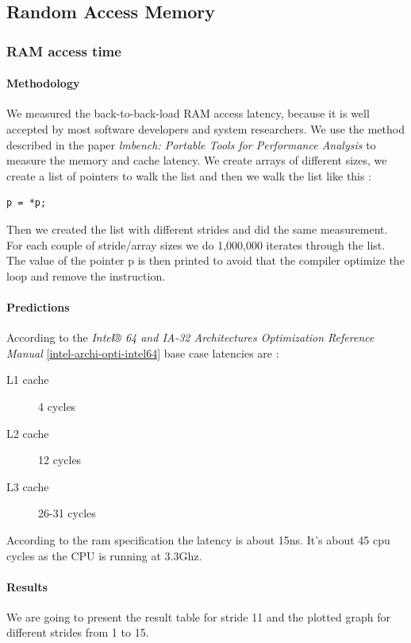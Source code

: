 \subsection{Random Access Memory}

\subsubsection{RAM access time}
\paragraph{Methodology}
We measured the back-to-back-load RAM access latency, because it is well accepted by most software developers and system researchers.
We use the method described in the paper \emph{lmbench: Portable Tools for Performance Analysis} to measure the memory and cache latency.
We create arrays of different sizes, we create a list of pointers to walk the list and then we walk the list like this :
\begin{verbatim}
p = *p;
\end{verbatim}

Then we created the list with different strides and did the same measurement.
For each couple of stride/array sizes we do 1,000,000 iterates through the list.
The value of the pointer p is then printed to avoid that the compiler optimize the loop and remove the instruction.

\paragraph{Predictions}
According to the \emph{Intel® 64 and IA-32 Architectures Optimization Reference Manual}
\ref{intel-archi-opti-intel64} base case latencies are :
\begin{description}
\item[L1 cache] 4 cycles
\item[L2 cache] 12 cycles
\item[L3 cache] 26-31 cycles
\end{description}
According to the ram specification the latency is about 15ns.
It's about 45 cpu cycles as the CPU is running at 3.3Ghz.


\paragraph{Results}
We are going to present the result table for stride 11 and the plotted graph for different strides from 1 to 15.

